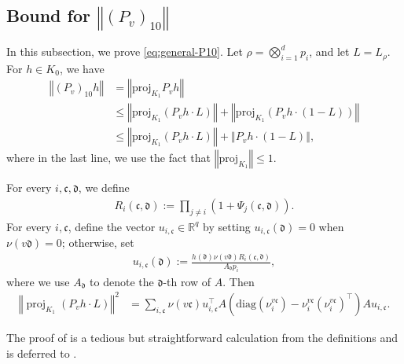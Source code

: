 \documentclass[a4paper,12pt]{article}
\theoremstyle{plain}
\theoremstyle{definition}
\def\*#1{\mathbf{#1}} %
\def\-#1{\mathrm{#1}} %
\def\!#1{\mathfrak{#1}} %
\def\*#1{\boldsymbol{#1}} %
\def\-#1{\mathrm{#1}} %
\def\!#1{\mathfrak{#1}} %
\newcommand{\norm}[1]{\left\Vert#1\right\Vert}
\newcommand{\tuple}[1]{\left(#1\right)}
\newcommand{\tp}{\tuple}
\begin{document}
\subsection{Bound for $\norm{(P_v)_{10}}$} \label{sec:general-P10}
In this subsection, we prove \eqref{eq:general-P10}.
Let $\rho=\bigotimes_{i=1}^d p_i$, and let $L=L_\rho$.
For $h \in K_0$, we have
\begin{align*}
  \norm{(P_v)_{10}h}
  &= \norm{\-{proj}_{K_1} P_v h} \\
  \tag{triangle ineq.}
  &\leq \norm{\-{proj}_{K_1} (P_v h \cdot L)} + \norm{\-{proj}_{K_1} (P_v h \cdot (1-L))} \\
  &\leq \norm{\-{proj}_{K_1} (P_v h \cdot L)} + \norm{P_v h \cdot (1-L)},
\end{align*}
where in the last line, we use the fact that $\norm{\-{proj}_{K_1}} \leq 1$.

\begin{proposition} \label{prop:master-form}
For every $i, \!c, \!d$, we define
\begin{align*}
  R_i(\!c,\!d) := \prod_{j\neq i} \tp{1 + \Psi_j(\!c,\!d)}.
\end{align*}
For every $i,\!c$, define the vector $u_{i,\!c}\in\mathbb R^q$ by setting
$u_{i,\!c}(\!d)=0$ when $\nu(v\!d)=0$; otherwise, set
\begin{align*}
  u_{i,\!c}(\!d) := \frac{h(\!d) \nu(v\!d) R_i(\!c,\!d)}{A_{\!d}p_i},
\end{align*}
where we use $A_{\!d}$ to denote the $\!d$-th row of $A$.
Then
  \begin{align*}
    \norm{\operatorname{proj}_{K_1}(P_v h \cdot L)}^2
    &= \sum_{i, \!c} \nu(v\!c) u_{i,\!c}^\intercal A \tp{ \-{diag}(\nu^{v\!c}_i)  - \nu^{v\!c}_i(\nu^{v\!c}_i)^{\intercal}} A u_{i,\!c}.
  \end{align*}
\end{proposition}
The proof of  is a tedious but straightforward calculation from the definitions and is deferred to .
\end{document}
